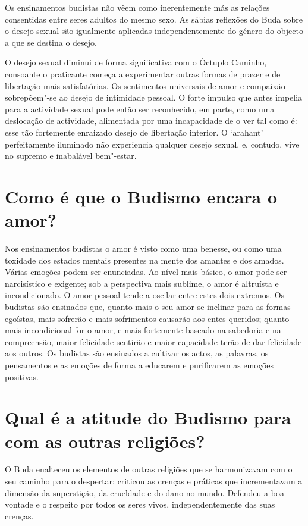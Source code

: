 Os ensinamentos budistas não vêem como inerentemente más as relações
consentidas entre seres adultos do mesmo sexo. As sábias reflexões do
Buda sobre o desejo sexual são igualmente aplicadas independentemente do
género do objecto a que se destina o desejo.

O desejo sexual diminui de forma significativa com o Óctuplo Caminho,
consoante o praticante começa a experimentar outras formas de prazer e
de libertação mais satisfatórias. Os sentimentos universais de amor e
compaixão sobrepõem"-se ao desejo de intimidade pessoal. O forte impulso
que antes impelia para a actividade sexual pode então ser reconhecido,
em parte, como uma deslocação de actividade, alimentada por uma
incapacidade de o ver tal como é: esse tão fortemente enraizado desejo
de libertação interior. O `arahant' perfeitamente iluminado não
experiencia qualquer desejo sexual, e, contudo, vive no supremo e
inabalável bem"-estar.

\section{Como é que o Budismo encara o amor?}

Nos ensinamentos budistas o amor é visto como uma benesse, ou como uma
toxidade dos estados mentais presentes na mente dos amantes e dos
amados. Várias emoções podem ser enunciadas. Ao nível mais básico, o
amor pode ser narcisístico e exigente; sob a perspectiva mais sublime, o
amor é altruísta e incondicionado. O amor pessoal tende a oscilar entre
estes dois extremos. Os budistas são ensinados que, quanto mais o seu
amor se inclinar para as formas egoístas, mais sofrerão e mais
sofrimentos causarão aos entes queridos; quanto mais incondicional for o
amor, e mais fortemente baseado na sabedoria e na compreensão, maior
felicidade sentirão e maior capacidade terão de dar felicidade aos
outros. Os budistas são ensinados a cultivar os actos, as palavras, os
pensamentos e as emoções de forma a educarem e purificarem as emoções
positivas.

\section{Qual é a atitude do Budismo para com as outras religiões?}

O Buda enalteceu os elementos de outras religiões que se harmonizavam
com o seu caminho para o despertar; criticou as crenças e práticas que
incrementavam a dimensão da superstição, da crueldade e do dano no
mundo. Defendeu a boa vontade e o respeito por todos os seres vivos,
independentemente das suas crenças.

